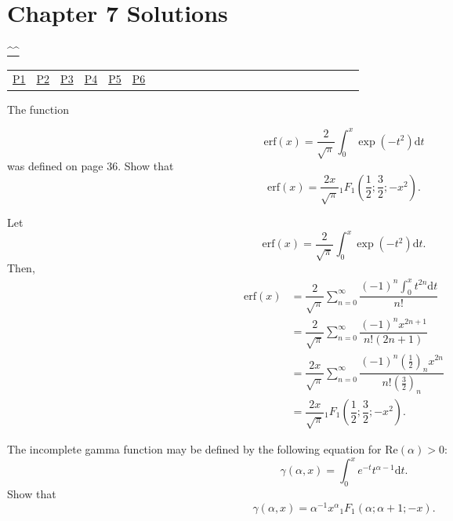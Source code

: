\section{Chapter 7 Solutions}
\begin{center}\hyperref[toc]{\^{}\^{}}\end{center}
\begin{center}\begin{tabular}{lllllllllllllllllllllllll}
\hyperref[problem1chapter7]{P1} & \hyperref[problem2chapter7]{P2} & \hyperref[problem3chapter7]{P3} & \hyperref[problem4chapter7]{P4} & \hyperref[problem5chapter7]{P5} & \hyperref[problem6chapter7]{P6} 
\end{tabular}\end{center}
\setcounter{problem}{0}
\setcounter{solution}{0}
\begin{problem}\label{problem1chapter7}
The function 

$$\mathrm{erf}(x) = \dfrac{2}{\sqrt{\pi}} \displaystyle\int_0^x \exp(-t^2) \mathrm{d}t$$
was defined on page 36. Show that
$$\mathrm{erf}(x) = \dfrac{2x}{\sqrt{\pi}} {}_1F_1 \left( \dfrac{1}{2}; \dfrac{3}{2}; -x^2 \right).$$
\end{problem}
\begin{solution}
Let 
$$\mathrm{erf}(x) = \dfrac{2}{\sqrt{\pi}} \displaystyle\int_0^x \exp(-t^2) \mathrm{d}t.$$
Then,
$$\begin{array}{ll}
\mathrm{erf}(x) &= \dfrac{2}{\sqrt{\pi}} \displaystyle\sum_{n=0}^{\infty} \dfrac{(-1)^n \displaystyle\int_0^x t^{2n} \mathrm{d}t}{n!} \\
&= \dfrac{2}{\sqrt{\pi}} \displaystyle\sum_{n=0}^{\infty} \dfrac{(-1)^n x^{2n+1}}{n! (2n+1)} \\
&= \dfrac{2x}{\sqrt{\pi}} \displaystyle\sum_{n=0}^{\infty} \dfrac{(-1)^n \left( \frac{1}{2} \right)_n x^{2n}}{n! \left( \frac{3}{2} \right)_n} \\
&= \dfrac{2x}{\sqrt{\pi}} {}_1F_1 \left( \dfrac{1}{2}; \dfrac{3}{2}; -x^2 \right).
\end{array}$$
\end{solution}
\begin{problem}\label{problem2chapter7}
The incomplete gamma function may be defined by the following equation for $\mathrm{Re}(\alpha)>0$:
$$\gamma(\alpha,x) = \displaystyle\int_0^x e^{-t} t^{\alpha-1} \mathrm{d}t.$$
Show that
$$\gamma(\alpha, x) = \alpha^{-1} x^{\alpha} {}_1F_1(\alpha; \alpha+1; -x).$$
\end{problem}

